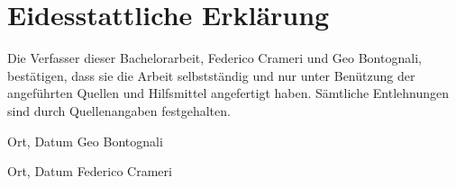 \thispagestyle{plain}

\section*{Eidesstattliche Erklärung}
Die Verfasser dieser Bachelorarbeit, Federico Crameri und Geo Bontognali, bestätigen, dass sie die Arbeit selbstständig und nur unter Benützung der angeführten Quellen und Hilfsmittel angefertigt haben. Sämtliche Entlehnungen sind durch Quellenangaben festgehalten.
	
	
\vspace{2.5cm}

\hspace{2cm} Ort, Datum \hfill Geo Bontognali \hspace{2cm}

\vspace{4cm}

\hspace{2cm} Ort, Datum \hfill Federico Crameri \hspace{2cm}





